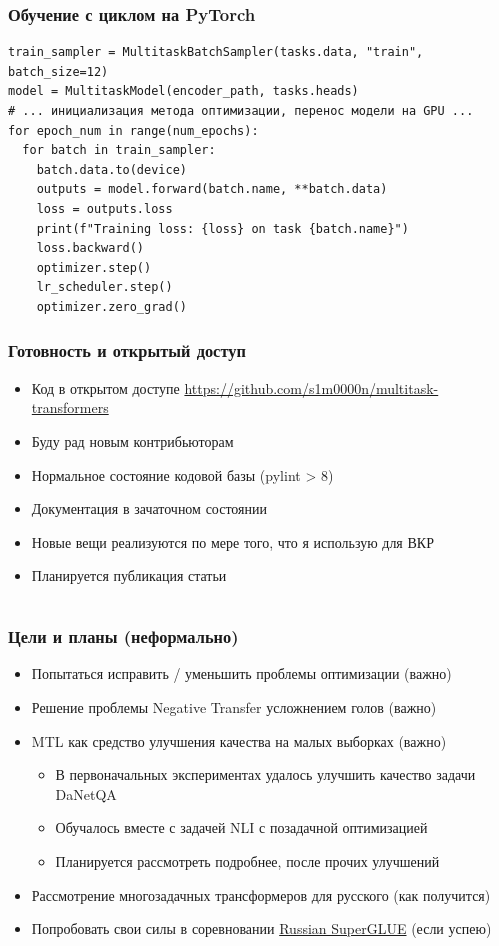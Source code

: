 \documentclass[aspectratio=169]{beamer}
\begin{document}
\begin{frame}[fragile]
	\frametitle{Обучение с циклом на PyTorch}
	\begin{verbatim}
train_sampler = MultitaskBatchSampler(tasks.data, "train", batch_size=12)
model = MultitaskModel(encoder_path, tasks.heads)
# ... инициализация метода оптимизации, перенос модели на GPU ...
for epoch_num in range(num_epochs):
  for batch in train_sampler:
    batch.data.to(device)
    outputs = model.forward(batch.name, **batch.data)
    loss = outputs.loss
    print(f"Training loss: {loss} on task {batch.name}")
    loss.backward()
    optimizer.step()
    lr_scheduler.step()
    optimizer.zero_grad()
	\end{verbatim}
\end{frame}


\begin{frame}
	\frametitle{Готовность и открытый доступ}
	\begin{itemize}
		\item Код в открытом доступе \url{https://github.com/s1m0000n/multitask-transformers}
		\item Буду рад новым контрибьюторам
		\item Нормальное состояние кодовой базы (pylint > 8)
		\item Документация в зачаточном состоянии
		\item Новые вещи реализуются по мере того, что я использую для ВКР
		\item Планируется публикация статьи
	\end{itemize}
\end{frame}


\section[Исследование многозадачных трансформеров]{}

\begin{frame}
	\frametitle{Цели и планы (неформально)}
	\begin{itemize}
		\item Попытаться исправить / уменьшить проблемы оптимизации (важно)
		\item Решение проблемы Negative Transfer усложнением голов (важно)
		\item MTL как средство улучшения качества на малых выборках (важно)
		\begin{itemize}
			\item В первоначальных экспериментах удалось улучшить качество задачи DaNetQA 
			\item Обучалось вместе с задачей NLI с позадачной оптимизацией
			\item Планируется рассмотреть подробнее, после прочих улучшений
		\end{itemize}
		\item Рассмотрение многозадачных трансформеров для русского (как получится)
		\item Попробовать свои силы в соревновании \href{https://russiansuperglue.com/}{\color {blue} Russian SuperGLUE} (если успею)
	\end{itemize}
\end{frame}
\end{document}
